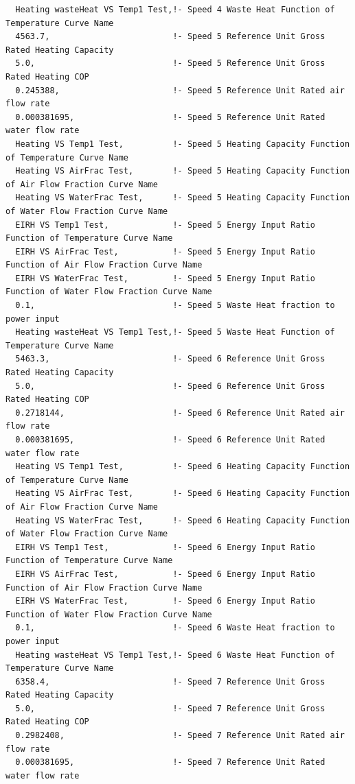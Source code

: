 \begin{lstlisting}
  Heating wasteHeat VS Temp1 Test,!- Speed 4 Waste Heat Function of Temperature Curve Name
  4563.7,                         !- Speed 5 Reference Unit Gross Rated Heating Capacity
  5.0,                            !- Speed 5 Reference Unit Gross Rated Heating COP
  0.245388,                       !- Speed 5 Reference Unit Rated air flow rate
  0.000381695,                    !- Speed 5 Reference Unit Rated water flow rate
  Heating VS Temp1 Test,          !- Speed 5 Heating Capacity Function of Temperature Curve Name
  Heating VS AirFrac Test,        !- Speed 5 Heating Capacity Function of Air Flow Fraction Curve Name
  Heating VS WaterFrac Test,      !- Speed 5 Heating Capacity Function of Water Flow Fraction Curve Name
  EIRH VS Temp1 Test,             !- Speed 5 Energy Input Ratio Function of Temperature Curve Name
  EIRH VS AirFrac Test,           !- Speed 5 Energy Input Ratio Function of Air Flow Fraction Curve Name
  EIRH VS WaterFrac Test,         !- Speed 5 Energy Input Ratio Function of Water Flow Fraction Curve Name
  0.1,                            !- Speed 5 Waste Heat fraction to power input
  Heating wasteHeat VS Temp1 Test,!- Speed 5 Waste Heat Function of Temperature Curve Name
  5463.3,                         !- Speed 6 Reference Unit Gross Rated Heating Capacity
  5.0,                            !- Speed 6 Reference Unit Gross Rated Heating COP
  0.2718144,                      !- Speed 6 Reference Unit Rated air flow rate
  0.000381695,                    !- Speed 6 Reference Unit Rated water flow rate
  Heating VS Temp1 Test,          !- Speed 6 Heating Capacity Function of Temperature Curve Name
  Heating VS AirFrac Test,        !- Speed 6 Heating Capacity Function of Air Flow Fraction Curve Name
  Heating VS WaterFrac Test,      !- Speed 6 Heating Capacity Function of Water Flow Fraction Curve Name
  EIRH VS Temp1 Test,             !- Speed 6 Energy Input Ratio Function of Temperature Curve Name
  EIRH VS AirFrac Test,           !- Speed 6 Energy Input Ratio Function of Air Flow Fraction Curve Name
  EIRH VS WaterFrac Test,         !- Speed 6 Energy Input Ratio Function of Water Flow Fraction Curve Name
  0.1,                            !- Speed 6 Waste Heat fraction to power input
  Heating wasteHeat VS Temp1 Test,!- Speed 6 Waste Heat Function of Temperature Curve Name
  6358.4,                         !- Speed 7 Reference Unit Gross Rated Heating Capacity
  5.0,                            !- Speed 7 Reference Unit Gross Rated Heating COP
  0.2982408,                      !- Speed 7 Reference Unit Rated air flow rate
  0.000381695,                    !- Speed 7 Reference Unit Rated water flow rate

\end{lstlisting}
